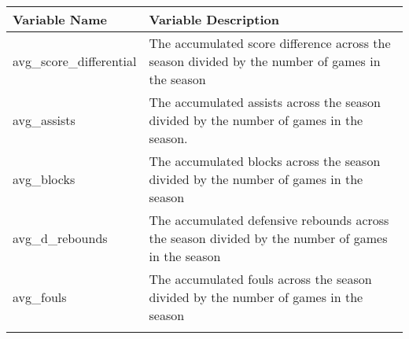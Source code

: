 \documentclass[
]{article}
\begin{document}
\begin{longtable}[]{@{}ll@{}}
\toprule
\begin{minipage}[b]{0.37\columnwidth}\raggedright
Variable Name\strut
\end{minipage} & \begin{minipage}[b]{0.57\columnwidth}\raggedright
Variable Description\strut
\end{minipage}\tabularnewline
\midrule
\endhead
\begin{minipage}[t]{0.37\columnwidth}\raggedright
avg\_score\_differential\strut
\end{minipage} & \begin{minipage}[t]{0.57\columnwidth}\raggedright
The accumulated score difference across the season divided by the number
of games in the season\strut
\end{minipage}\tabularnewline
\begin{minipage}[t]{0.37\columnwidth}\raggedright
avg\_assists\strut
\end{minipage} & \begin{minipage}[t]{0.57\columnwidth}\raggedright
The accumulated assists across the season divided by the number of games
in the season.\strut
\end{minipage}\tabularnewline
\begin{minipage}[t]{0.37\columnwidth}\raggedright
avg\_blocks\strut
\end{minipage} & \begin{minipage}[t]{0.57\columnwidth}\raggedright
The accumulated blocks across the season divided by the number of games
in the season\strut
\end{minipage}\tabularnewline
\begin{minipage}[t]{0.37\columnwidth}\raggedright
avg\_d\_rebounds\strut
\end{minipage} & \begin{minipage}[t]{0.57\columnwidth}\raggedright
The accumulated defensive rebounds across the season divided by the
number of games in the season\strut
\end{minipage}\tabularnewline
\begin{minipage}[t]{0.37\columnwidth}\raggedright
avg\_fouls\strut
\end{minipage} & \begin{minipage}[t]{0.57\columnwidth}\raggedright
The accumulated fouls across the season divided by the number of games
in the season\strut
\end{minipage}\tabularnewline
\begin{minipage}[t]{0.37\columnwidth}\raggedright

\end{minipage}
\end{longtable}
\end{document}
